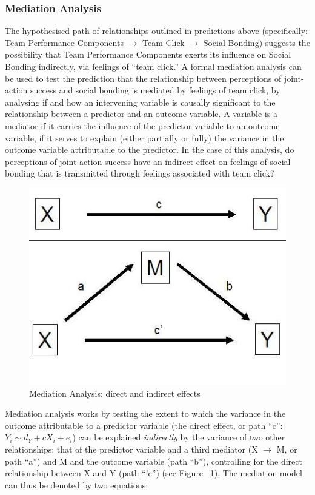 {\subsubsection{Mediation Analysis}
The hypothesised path of relationships outlined in predictions above (specifically: Team Performance Components $\rightarrow$ Team Click $\rightarrow$ Social Bonding) suggests the possibility that Team Performance Components exerts its influence on Social Bonding indirectly, via feelings of ``team click.''  A formal mediation analysis can be used to test the prediction that the relationship between perceptions of joint-action success and social bonding is mediated by feelings of team click, by analysing if and how an intervening variable is causally significant to the relationship between a predictor and an outcome variable. A variable is a mediator if it carries the influence of the predictor variable to an outcome variable, if it serves to explain (either partially or fully) the variance in the outcome variable attributable to the predictor. In the case of this analysis, do perceptions of joint-action success have an indirect effect on feelings of social bonding that is transmitted through feelings associated with team click?

\begin{figure}[htbp]
  \begin{center}
    \includegraphics[scale = .5]{images/mediation_image.jpg}
    \caption{Mediation Analysis: direct and indirect effects}
    \label{fig:mediationAnalysis}
  \end{center}
\end{figure}

Mediation analysis works by testing the extent to which the variance in the outcome attributable to a predictor variable (the direct effect, or path ``c'': $Y_i \sim d_Y + cX_i + e_i$) can be explained \textit{indirectly} by the variance of two other relationships: that of the predictor variable and a third mediator (X $\rightarrow$ M, or path ``a'')  and M and the outcome variable (path ``b''), controlling for the direct relationship between X and Y (path ``'c'') (see Figure ~\ref{fig:mediationAnalysis}). The mediation model can thus be denoted by two equations:

}
